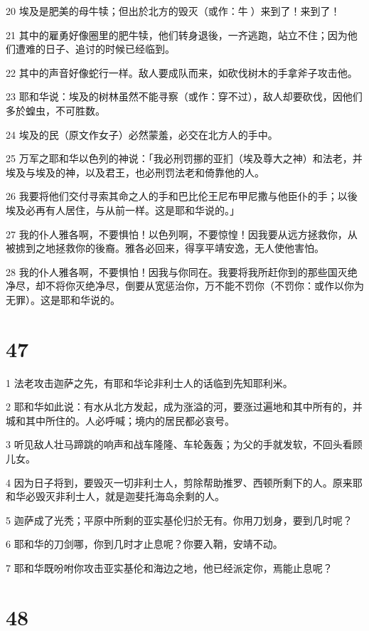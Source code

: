 \par 20 埃及是肥美的母牛犊；但出於北方的毁灭（或作：牛）来到了！来到了！
\par 21 其中的雇勇好像圈里的肥牛犊，他们转身退後，一齐逃跑，站立不住；因为他们遭难的日子、追讨的时候已经临到。
\par 22 其中的声音好像蛇行一样。敌人要成队而来，如砍伐树木的手拿斧子攻击他。
\par 23 耶和华说：埃及的树林虽然不能寻察（或作：穿不过），敌人却要砍伐，因他们多於蝗虫，不可胜数。
\par 24 埃及的民（原文作女子）必然蒙羞，必交在北方人的手中。
\par 25 万军之耶和华以色列的神说：「我必刑罚挪的亚扪（埃及尊大之神）和法老，并埃及与埃及的神，以及君王，也必刑罚法老和倚靠他的人。
\par 26 我要将他们交付寻索其命之人的手和巴比伦王尼布甲尼撒与他臣仆的手；以後埃及必再有人居住，与从前一样。这是耶和华说的。」
\par 27 我的仆人雅各啊，不要惧怕！以色列啊，不要惊惶！因我要从远方拯救你，从被掳到之地拯救你的後裔。雅各必回来，得享平靖安逸，无人使他害怕。
\par 28 我的仆人雅各啊，不要惧怕！因我与你同在。我要将我所赶你到的那些国灭绝净尽，却不将你灭绝净尽，倒要从宽惩治你，万不能不罚你（不罚你：或作以你为无罪）。这是耶和华说的。

\chapter{47}

\par 1 法老攻击迦萨之先，有耶和华论非利士人的话临到先知耶利米。
\par 2 耶和华如此说：有水从北方发起，成为涨溢的河，要涨过遍地和其中所有的，并城和其中所住的。人必呼喊；境内的居民都必哀号。
\par 3 听见敌人壮马蹄跳的响声和战车隆隆、车轮轰轰；为父的手就发软，不回头看顾儿女。
\par 4 因为日子将到，要毁灭一切非利士人，剪除帮助推罗、西顿所剩下的人。原来耶和华必毁灭非利士人，就是迦斐托海岛余剩的人。
\par 5 迦萨成了光秃；平原中所剩的亚实基伦归於无有。你用刀划身，要到几时呢？
\par 6 耶和华的刀剑哪，你到几时才止息呢？你要入鞘，安靖不动。
\par 7 耶和华既吩咐你攻击亚实基伦和海边之地，他已经派定你，焉能止息呢？

\chapter{48}

